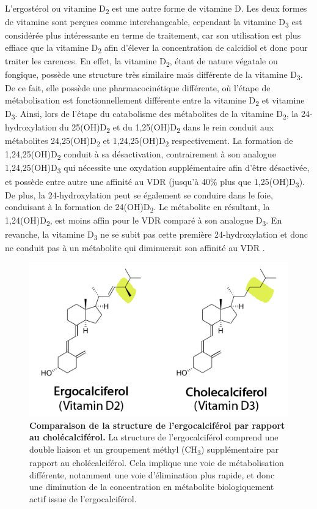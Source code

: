 \documentclass[
  a4paper,
  DIV=11,
  numbers=noendperiod,
  listof=totoc]{scrreprt}
\begin{document}
L'ergostérol ou vitamine D\textsubscript{2} est une autre forme de
vitamine D. Les deux formes de vitamine sont perçues comme
interchangeable, cependant la vitamine D\textsubscript{3} est considérée
plus intéressante en terme de traitement, car son utilisation est plus
effiace que la vitamine D\textsubscript{2} afin d'élever la
concentration de calcidiol et donc pour traiter les carences. En effet,
la vitamine D\textsubscript{2}, étant de nature végatale ou fongique,
possède une structure très similaire mais différente de la vitamine
D\textsubscript{3}. De ce fait, elle possède une pharmacocinétique
différente, où l'étape de métabolisation est fonctionnellement
différente entre la vitamine D\textsubscript{2} et vitamine
D\textsubscript{3}. Ainsi, lors de l'étape du catabolisme des
métabolites de la vitamine D\textsubscript{2}, la 24-hydroxylation du
25(OH)D\textsubscript{2} et du 1,25(OH)D\textsubscript{2} dans le rein
conduit aux métabolites 24,25(OH)D\textsubscript{2} et
1,24,25(OH)D\textsubscript{2} respectivement. La formation de
1,24,25(OH)D\textsubscript{2} conduit à sa désactivation, contrairement
à son analogue 1,24,25(OH)D\textsubscript{3} qui nécessite une oxydation
supplémentaire afin d'être désactivée, et possède entre autre une
affinité au VDR (jusqu'à 40\% plus que 1,25(OH)D\textsubscript{3}). De
plus, la 24-hydroxylation peut se également se conduire dans le foie,
conduisant à la formation de 24(OH)D\textsubscript{2}. Le métabolite en
résultant, la 1,24(OH)D\textsubscript{2}, est moins affin pour le VDR
comparé à son analogue D\textsubscript{3}. En revanche, la vitamine
D\textsubscript{3} ne se subit pas cette première 24-hydroxylation et
donc ne conduit pas à un métabolite qui diminuerait son affinité au VDR
\autocite{Houghton.2006}.

\begin{figure}
\includegraphics{figures/ergo_vs_chole.png} 
\caption[\textbf{Comparaison de la structure de l'ergocalciférol par rapport au cholécalciférol.}]{\textbf{Comparaison de la structure de l'ergocalciférol par rapport au cholécalciférol.} La structure de l'ergocalciférol comprend une double liaison et un groupement méthyl (CH\textsubscript{3}) supplémentaire par rapport au cholécalciférol. Cela implique une voie de métabolisation différente, notamment une voie d'élimination plus rapide, et donc une diminution de la concentration en métabolite biologiquement actif issue de l'ergocalciférol. \cite{Houghton.2006}}
\label{fig:ergo-struc}
\end{figure}
\end{document}
